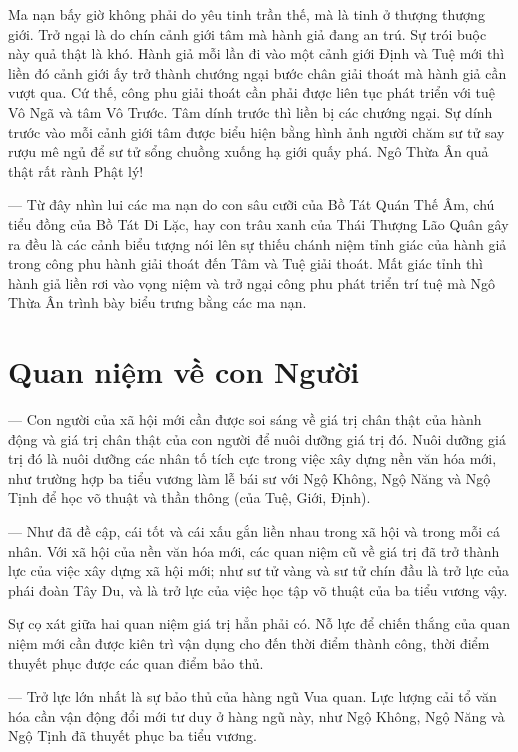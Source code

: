 Ma nạn bấy giờ không phải do yêu tinh trần thế, mà là tinh ở thượng thượng giới. Trở ngại là do chín cảnh giới tâm mà hành giả đang an trú. Sự trói buộc này quả thật là khó. Hành giả mỗi lần đi vào một cảnh giới Định và Tuệ mới thì liền đó cảnh giới ấy trở thành chướng ngại bước chân giải thoát mà hành giả cần vượt qua. Cứ thế, công phu giải thoát cần phải được liên tục phát triển với tuệ Vô Ngã và tâm Vô Trước. Tâm dính trước thì liền bị các chướng ngại. Sự dính trước vào mỗi cảnh giới tâm được biểu hiện bằng hình ảnh người chăm sư tử say rượu mê ngủ để sư tử sổng chuồng xuống hạ giới quấy phá. Ngô Thừa Ân quả thật rất rành Phật lý!

— Từ đây nhìn lui các ma nạn do con sâu cưỡi của Bồ Tát Quán Thế Âm, chú tiểu đồng của Bồ Tát Di Lặc, hay con trâu xanh của Thái Thượng Lão Quân gây ra đều là các cảnh biểu tượng nói lên sự thiếu chánh niệm tỉnh giác của hành giả trong công phu hành giải thoát đến Tâm và Tuệ giải thoát. Mất giác tỉnh thì hành giả liền rơi vào vọng niệm và trở ngại công phu phát triển trí tuệ mà Ngô Thừa Ân trình bày biểu trưng bằng các ma nạn.

\section{Quan niệm về con Người} %
\label{sec:88_89_90_con_nguoi}

— Con người của xã hội mới cần được soi sáng về giá trị chân thật của hành động và giá trị chân thật của con người để nuôi dưỡng giá trị đó. Nuôi dưỡng giá trị đó là nuôi dưỡng các nhân tố tích cực trong việc xây dựng nền văn hóa mới, như trường hợp ba tiểu vương làm lễ bái sư với Ngộ Không, Ngộ Năng và Ngộ Tịnh để học võ thuật và thần thông (của Tuệ, Giới, Định).

— Như đã đề cập, cái tốt và cái xấu gắn liền nhau trong xã hội và trong mỗi cá nhân. Với xã hội của nền văn hóa mới, các quan niệm cũ về giá trị đã trở thành lực của việc xây dựng xã hội mới; như sư tử vàng và sư tử chín đầu là trở lực của phái đoàn Tây Du, và là trở lực của việc học tập võ thuật của ba tiểu vương vậy.

Sự cọ xát giữa hai quan niệm giá trị hẳn phải có. Nỗ lực để chiến thắng của quan niệm mới cần được kiên trì vận dụng cho đến thời điểm thành công, thời điểm thuyết phục được các quan điểm bảo thủ.

— Trở lực lớn nhất là sự bảo thủ của hàng ngũ Vua quan. Lực lượng cải tổ văn hóa cần vận động đổi mới tư duy ở hàng ngũ này, như Ngộ Không, Ngộ Năng và Ngộ Tịnh đã thuyết phục ba tiểu vương.

